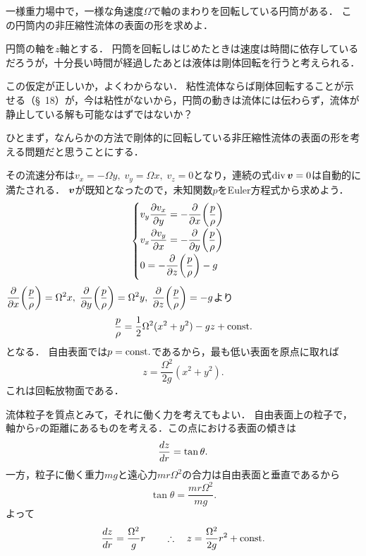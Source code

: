 
\begin{mondai}{}{}
一様重力場中で，一様な角速度$\Omega$で軸のまわりを回転している円筒がある．
この円筒内の非圧縮性流体の表面の形を求めよ．
\end{mondai}
\begin{kaitou}
円筒の軸を$z$軸とする．
円筒を回転しはじめたときは速度は時間に依存しているだろうが，十分長い時間が経過したあとは液体は剛体回転を行うと考えられる．
\begin{details}
この仮定が正しいか，よくわからない．
粘性流体ならば剛体回転することが示せる（\S~18）が，今は粘性がないから，円筒の動きは流体には伝わらず，流体が静止している解も可能なはずではないか？

ひとまず，なんらかの方法で剛体的に回転している非圧縮性流体の表面の形を考える問題だと思うことにする．
\end{details}
\noindent
その流速分布は$v_x = -\Omega y, \; v_y = \Omega x, \; v_z=0$となり，連続の式$\operatorname{div}\vb*{v}=0$は自動的に満たされる．
$\vb*{v}$が既知となったので，未知関数$p$をEuler方程式から求めよう．
\[
    \begin{cases}
        v_y \dpdv{v_x}{y} = - \dpdv{x} \pqty{\dfrac{p}{\rho}} \\[7pt]
        v_x \dpdv{v_y}{x} = - \dpdv{y} \pqty{\dfrac{p}{\rho}} \\[7pt]
        0 = - \dpdv{z} \pqty{\dfrac{p}{\rho}} -g \\[7pt]
    \end{cases}
\]
$\dpdv{x}\pqty{\dfrac{p}{\rho}}=\Omega^2x, \; \dpdv{y}\pqty{\dfrac{p}{\rho}}=\Omega^2y, \; \dpdv{z}\pqty{\dfrac{p}{\rho}}=-g$より
\[
    \frac{p}{\rho} = \frac{1}{2}\Omega^2 (x^2+y^2) -gz + \mathrm{const.}
\]
となる．
自由表面では$p=\mathrm{const.}$であるから，最も低い表面を原点に取れば
\[
    z = \frac{\Omega^2}{2g} (x^2+y^2) .
\]
これは回転放物面である．

\begin{details}
流体粒子を質点とみて，それに働く力を考えてもよい．
自由表面上の粒子で，軸から$r$の距離にあるものを考える．この点における表面の傾きは
\[
    \dv{z}{r} = \tan\theta.
\]
一方，粒子に働く重力$mg$と遠心力$mr\Omega^2$の合力は自由表面と垂直であるから
\[
    \tan\theta = \frac{mr\Omega^2}{mg} .
\]
よって
\[
    \dv{z}{r} = \frac{\Omega^2}{g}r
    \qquad\therefore\quad z = \frac{\Omega^2}{2g}r^2 + \mathrm{const.}
\]


\end{details}
\end{kaitou}



